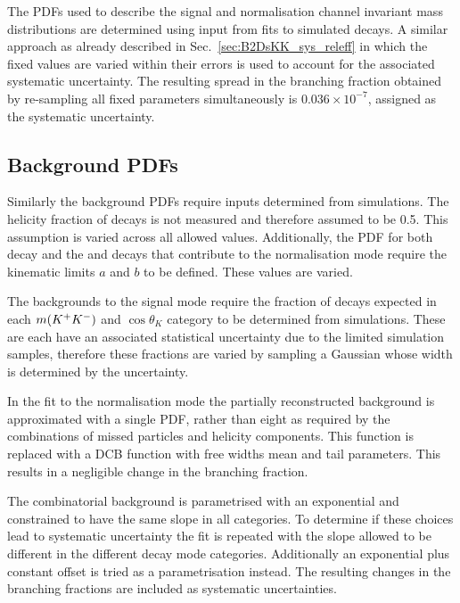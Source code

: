 The PDFs used to describe the signal and normalisation channel invariant mass distributions are determined using input from fits to simulated decays. A similar approach as already described in Sec.~\ref{sec:B2DsKK_sys_releff} in which the fixed values are varied within their errors is used to account for the associated systematic uncertainty. 
The resulting spread in the branching fraction obtained by re-sampling all fixed parameters simultaneously is $0.036\times10^{-7}$, assigned as the systematic uncertainty.

\subsection{Background PDFs}
Similarly the background PDFs require inputs determined from simulations. 
The helicity fraction of \decay{\Bp}{\Dssp\phiz} decays is not measured and therefore assumed to be 0.5. This assumption is varied across all allowed values. Additionally, the PDF for both \decay{\Bp}{\Dssp\phiz} decay and the \decay{\Bp}{\Dssp\Dzb} and \decay{\Bp}{\Dsp\Dstarzb} decays that contribute to the normalisation mode require the kinematic limits $a$ and $b$ to be defined. These values are varied. 

The backgrounds to the signal mode require the fraction of decays expected in each $m({{K}^+}{{K}^-})$ and $\cos{\theta_{K}}$ category to be determined from simulations. These are each have an associated statistical uncertainty due to the limited simulation samples, therefore these fractions are varied by sampling a Gaussian whose width is determined by the uncertainty. 

In the fit to the normalisation mode the partially reconstructed background \decay{\Bp}{\Dssp\Dstarzb} is approximated with a single PDF, rather than eight as required by the combinations of missed particles and helicity components. This function is replaced with a DCB function with free widths mean and tail parameters. This results in a negligible change in the branching fraction. 

The combinatorial background is parametrised with an exponential and constrained to have the same slope in all categories. To determine if these choices lead to systematic uncertainty the fit is repeated with the slope allowed to be different in the different \Dsp decay mode categories. Additionally an exponential plus constant offset is tried as a parametrisation instead. The resulting changes in the branching fractions are included as systematic uncertainties.  

